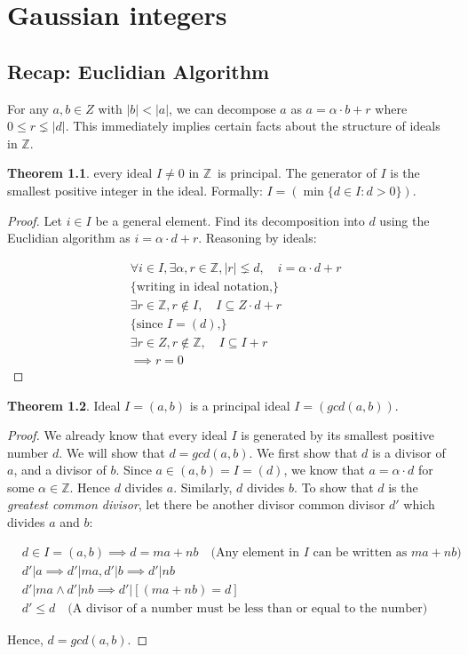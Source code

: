 \documentclass{book}
\newcommand{\Z}{\ensuremath{\mathbb{Z}}}
\theoremstyle{definition}
\newtheorem{theorem}{Theorem}
\begin{document}
\chapter{Gaussian integers}
\section{Recap: Euclidian Algorithm}
For any $a, b \in Z$ with $|b| < |a|$, we can decompose $a$ as
$a = \alpha \cdot b + r$ where $0 \leq r \lneq |d|$. This immediately implies
certain facts about the structure of ideals in \Z. 

\begin{theorem}
every ideal $I \neq 0$ in \Z~is principal. The generator of $I$
is the smallest positive integer in the ideal. Formally: $I = (\min\{ d \in I : d > 0 \})$.
\end{theorem}


\begin{proof}
Let $i \in I$ be a general element. Find its decomposition into $d$ using the
Euclidian algorithm as $i = \alpha \cdot d + r$.
Reasoning by ideals:

\begin{align*}
&\forall i \in I, \exists \alpha, r \in \Z, |r| \lneq d, \quad i = \alpha \cdot d + r \\
&\{ \text{writing in ideal notation,} \} \\
&\exists r \in \Z, r \not \in I,  \quad I \subseteq Z \cdot d + r \\
&\{ \text{since $I = (d)$,} \} \\
&\exists r \in Z, r \not \in \Z, \quad I \subseteq  I + r \\
&\implies r = 0
\end{align*}
\end{proof}

\begin{theorem}
Ideal $I = (a, b)$ is a principal ideal $I = (gcd(a, b))$.
\end{theorem}
\begin{proof}
We already know that every ideal $I$ is generated by its smallest positive number $d$.
We will show that $d = gcd(a, b)$. We first show that $d$ is a divisor of $a$, and
a divisor of $b$.
Since $a \in (a, b) = I = (d)$, we know that $a = \alpha \cdot d$
for some $\alpha \in \Z$. Hence $d$ divides $a$. Similarly, $d$ divides $b$.
To show that $d$ is the \emph{greatest common divisor}, let there be another
divisor common divisor $d'$ which divides $a$ and $b$:

\begin{align*}
& d \in I = (a, b) \implies d = ma + nb \quad \text{(Any element in $I$ can be written as $ma + nb$)} \\
&d' | a \implies d' | m a,d' | b \implies d' | n b \\
&d' | m a \land d' | n b \implies d' | [(m a + n b) = d]\\
& d' \leq d \quad \text{(A divisor of a number must be less than or equal to the number)}
\end{align*}             

Hence, $d = gcd(a, b)$.
\end{proof}
\end{document}

